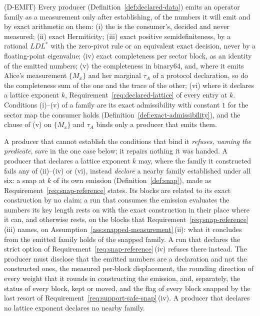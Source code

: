 \begin{requirement}\label{req:exact-emission}
(D-EMIT) Every producer (Definition~\ref{def:declared-data}) emits an operator
family as a measurement only after establishing, of the
numbers it will emit and by exact arithmetic on them: (i) the
 is the
consumer's, decided and never measured; (ii) exact Hermiticity; (iii) exact
positive semidefiniteness, by a rational $LDL^{*}$ with the zero-pivot rule or
an equivalent exact decision, never by a floating-point eigenvalue; (iv) exact
completeness per sector block, as an identity of the emitted numbers; (v) the
completeness   in
binary64, and, where
it emits Alice's measurement $\{M_x\}$ and her marginal $\tau_A$ of a protocol
declaration, so do the completeness sum of the one and the trace of the other;
(vi) where it declares a lattice exponent $k$, Requirement~\ref{req:declared-lattice}
of every entry at $k$. Conditions (i)--(v) of a family are its exact
admissibility with constant $1$ for the sector map the consumer holds
(Definition~\ref{def:exact-admissibility}), and the clause of (v) on
$\{M_x\}$ and $\tau_A$ binds only a producer that emits them.

A producer that cannot establish the conditions that bind it \emph{refuses,
naming the predicate}, save in the one case below; it repairs nothing it was
handed. A producer that declares a lattice exponent $k$ may, where the family it
constructed fails any of (ii)--(iv) or (vi), instead \emph{declare} a nearby
family established under all six: a snap at $k$ of its own emission
(Definition~\ref{def:snap}), made as Requirement~\ref{req:snap-reference}
states. Its  blocks are related to its exact construction by no
claim; a run that consumes the emission evaluates the numbers its key length
rests on with the exact construction in their place where it can, and
otherwise rests, on the blocks that Requirement~\ref{req:snap-reference}\,(iii)
names, on Assumption~\ref{ass:snapped-measurement}\,(ii): what it concludes
from the emitted family holds of the snapped family. A run that declares the
strict option of Requirement~\ref{req:snap-reference}\,(iv) refuses there
instead. The producer must disclose that the emitted numbers are a
declaration and not the constructed ones, the measured per-block
displacement, the rounding direction of every weight that it rounds in
constructing the emission, and, separately, the status of every block, kept
or moved, and the flag of every block snapped by the last resort of
Requirement~\ref{req:support-safe-snap}\,(iv). A producer that
declares no lattice exponent declares no nearby family.
\end{requirement}
